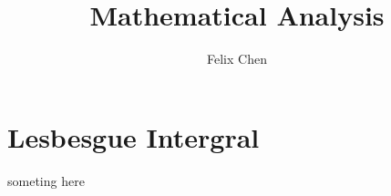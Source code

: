 \documentclass{article}
\begin{document}
	\title{Mathematical Analysis \uppercase\expandafter{}}
	\author{Felix Chen}
	\date{}
	\maketitle
	\tableofcontents
	

	\section{Lesbesgue Intergral}
	\label{sec:Lesbesgue Intergral}
	someting here
\end{document}
